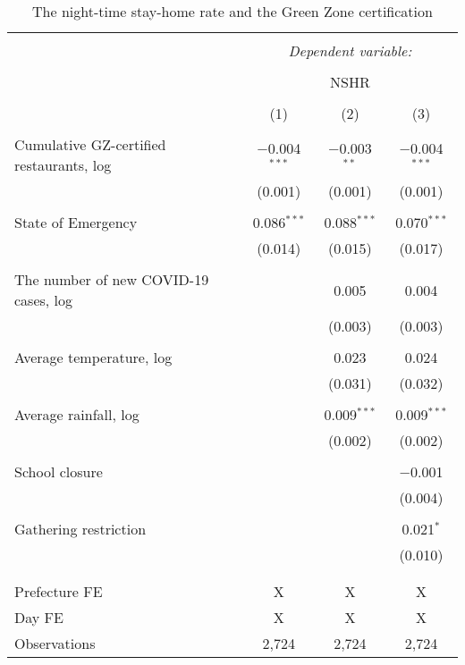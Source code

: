 
\begin{table}[H] \centering 
  \caption{The night-time stay-home rate and the Green Zone certification} 
  \label{} 
\footnotesize 
\begin{tabular}{@{\extracolsep{1pt}}lccc} 
\\[-1.8ex]\hline 
\hline \\[-1.8ex] 
 & \multicolumn{3}{c}{\textit{Dependent variable:}} \\ 
\cline{2-4} 
\\[-1.8ex] & \multicolumn{3}{c}{NSHR} \\ 
\\[-1.8ex] & (1) & (2) & (3)\\ 
\hline \\[-1.8ex] 
 Cumulative GZ-certified restaurants, log & $-$0.004$^{***}$ & $-$0.003$^{**}$ & $-$0.004$^{***}$ \\ 
  & (0.001) & (0.001) & (0.001) \\ 
  & & & \\ 
 State of Emergency & 0.086$^{***}$ & 0.088$^{***}$ & 0.070$^{***}$ \\ 
  & (0.014) & (0.015) & (0.017) \\ 
  & & & \\ 
 The number of new COVID-19 cases, log &  & 0.005 & 0.004 \\ 
  &  & (0.003) & (0.003) \\ 
  & & & \\ 
 Average temperature, log &  & 0.023 & 0.024 \\ 
  &  & (0.031) & (0.032) \\ 
  & & & \\ 
 Average rainfall, log &  & 0.009$^{***}$ & 0.009$^{***}$ \\ 
  &  & (0.002) & (0.002) \\ 
  & & & \\ 
 School closure &  &  & $-$0.001 \\ 
  &  &  & (0.004) \\ 
  & & & \\ 
 Gathering restriction &  &  & 0.021$^{*}$ \\ 
  &  &  & (0.010) \\ 
  & & & \\ 
\hline \\[-1.8ex] 
Prefecture FE & X & X & X \\ 
Day FE & X & X & X \\ 
Observations & 2,724 & 2,724 & 2,724 \\ 

\end{tabular}
\end{table}
